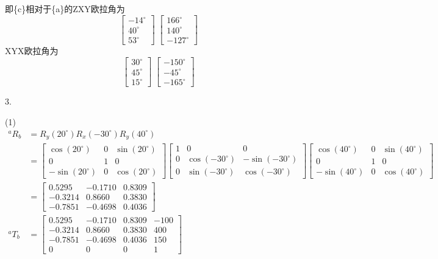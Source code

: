 \documentclass[UTF8, 13pt]{ctexart}
\begin{document}
即\{c\}相对于\{a\}的ZXY欧拉角为
\[
\begin{bmatrix}
    -14^\circ \\ 40^\circ \\ 53^\circ
\end{bmatrix} \;
\begin{bmatrix}
    166^\circ \\ 140^\circ \\ -127^\circ
\end{bmatrix}
\]
XYX欧拉角为
\[
\begin{bmatrix}
    30^\circ \\ 45^\circ \\ 15^\circ
\end{bmatrix} \;
\begin{bmatrix}
    -150^\circ \\ -45^\circ \\ -165^\circ
\end{bmatrix}
\]

\newpage

3.

(1)
\[
\begin{aligned}
    {}^a R_b &= R_y(20^\circ) R_x(-30^\circ) R_y(40^\circ) \\
            &=
            \begin{bmatrix}
                \cos(20^\circ) & 0 & \sin(20^\circ) \\
                0 & 1 & 0 \\
                -\sin(20^\circ) & 0 & \cos(20^\circ)
            \end{bmatrix}
            \begin{bmatrix}
                1 & 0 & 0 \\
                0 & \cos(-30^\circ) & -\sin(-30^\circ) \\
                0 & \sin(-30^\circ) & \cos(-30^\circ)
            \end{bmatrix}
            \begin{bmatrix}
                \cos(40^\circ) & 0 & \sin(40^\circ) \\
                0 & 1 & 0 \\
                -\sin(40^\circ) & 0 & \cos(40^\circ)
            \end{bmatrix} \\
            &=
            \begin{bmatrix}
                0.5295 & -0.1710 &  0.8309 \\
                -0.3214 &  0.8660 &  0.3830 \\
                -0.7851 & -0.4698 &  0.4036
            \end{bmatrix} \\
    {}^a T_b &= 
        \begin{bmatrix}
            0.5295 & -0.1710 &  0.8309 & -100 \\
            -0.3214 &  0.8660 &  0.3830 & 400 \\
            -0.7851 & -0.4698 &  0.4036 & 150 \\
            0 & 0 & 0 & 1
        \end{bmatrix}
\end{aligned}
\]
\vspace{1em}
\end{document}
